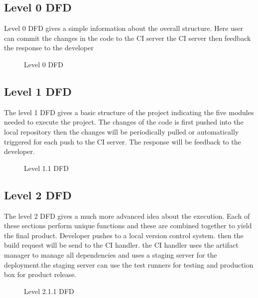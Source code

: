 \documentclass[12pt,a4paper,oneside]{report}
\begin{document}
{\newpage
\subsection{Level 0 DFD}
Level 0 DFD gives a simple information about the overall structure. Here user can commit the changes in the code to the CI server the CI server then feedback the response to the developer
\begin{figure}[h!]
\begin{center}

\hspace{1 in}
\caption{Level 0 DFD}
\end{center}
\end{figure}
\newpage
\subsection{Level 1 DFD}
The level 1 DFD gives a basic structure of the project indicating the five modules needed to execute the project. The changes of the code is first pushed into the local repository then the changes will be periodically pulled or automatically triggered for each push to the CI server. The response will be feedback to the developer.
\begin{figure}[h]
\begin{center}
\hspace{1 in}
\caption{Level 1.1 DFD}
\end{center}
\vspace{-1.5 in}
\end{figure}

\vspace{100pt}
\subsection{Level 2 DFD}
The level 2 DFD gives a much more advanced idea about the execution. Each of these sections perform unique functions and these are combined together to yield the final product. Developer pushes to a local version control system. then the build request will be send to the CI handler. the CI handler uses the artifact manager to manage all dependencies and uses a staging server for the deployment.the staging server can use the test runners for testing and production box for product release.
\newpage
\begin{figure}[h]
\begin{center}
\vspace{0.5 in}
\hspace{.0 in}
\caption{Level 2.1.1 DFD}
\end{center}


\end{figure}}
\end{document}

